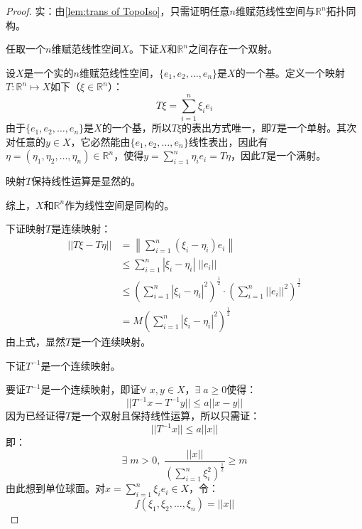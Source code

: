 \begin{proof}
	实：由\cref{lem:trans of TopoIso}，只需证明任意$n$维赋范线性空间与$\mathbb{R}^n$拓扑同构。\par
	任取一个$n$维赋范线性空间$X$。下证$X$和$\mathbb{R}^n$之间存在一个双射。\par
	设$X$是一个实的$n$维赋范线性空间，$\{e_1,e_2,\dots,e_n\}$是$X$的一个基。定义一个映射$T:\mathbb{R}^n\mapsto X$如下（$\xi\in\mathbb{R}^n$）：
	\begin{equation*}
		T\xi=\sum_{i=1}^n\xi_ie_i
	\end{equation*}
	由于$\{e_1,e_2,\dots,e_n\}$是$X$的一个基，所以$T\xi$的表出方式唯一，即$T$是一个单射。其次对任意的$y\in X$，它必然能由$\{e_1,e_2,\dots,e_n\}$线性表出，因此有$\eta=(\eta_1,\eta_2,\dots,\eta_n)\in\mathbb{R}^n$，使得$y=\sum\limits_{i=1}^n\eta_ie_i=T\eta$，因此$T$是一个满射。\par
	映射$T$保持线性运算是显然的。\par
	综上，$X$和$\mathbb{R}^n$作为线性空间是同构的。\par
	下证映射$T$是连续映射：
	\begin{align*}
		||T\xi-T\eta||
		&=\left\|\sum_{i=1}^n(\xi_i-\eta_i)e_i\right\| \\
		&\leqslant\sum_{i=1}^n|\xi_i-\eta_i|\;||e_i|| \\
		&\leqslant\left(\sum_{i=1}^n|\xi_i-\eta_i|^2\right)^\frac{1}{2}\cdot\left(\sum_{i=1}^n||e_i||^2\right)^\frac{1}{2} \\
		&=M\left(\sum_{i=1}^n|\xi_i-\eta_i|^2\right)^\frac{1}{2}
	\end{align*}
	由上式，显然$T$是一个连续映射。\par
	下证$T^{-1}$是一个连续映射。\par
	要证$T^{-1}$是一个连续映射，即证$\forall\;x,y\in X$，$\exists\;a\geqslant0$使得：
	\begin{equation*}
		||T^{-1}x-T^{-1}y||\leqslant a||x-y||
	\end{equation*}
	因为已经证得$T$是一个双射且保持线性运算，所以只需证：
	\begin{equation*}
		||T^{-1}x||\leqslant a||x||
	\end{equation*}
	即：
	\begin{equation*}
		\exists\;m>0,\;\frac{||x||}{\left(\sum\limits_{i=1}^n\xi_i^2\right)^\frac{1}{2}}\geqslant m
	\end{equation*}
	由此想到单位球面。对$x=\sum\limits_{i=1}^n\xi_ie_i\in X$，令：
	\begin{equation*}
		f(\xi_1,\xi_2,\dots,\xi_n)=||x||
	\end{equation*}

\end{proof}
